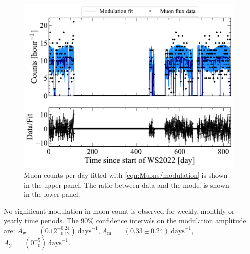 \begin{figure}
    \centering
    \includegraphics[width=0.8\linewidth]{figures/Muons/MuonModulation_MuonFlux_dayFitted.pdf}
    \caption[Muon counts per day fitted with \autoref{eqn:Muons/modulation} is shown in the upper panel. The ratio between data and the model is shown in the lower panel.]{Muon counts per day fitted with \autoref{eqn:Muons/modulation} is shown in the upper panel. The ratio between data and the model is shown in the lower panel.}
    \label{fig:Muons/MuonFlux_dayFitted}
\end{figure}
No significant modulation in muon count is observed for weekly, monthly or yearly time periods. The 90\% confidence intervals on the modulation amplitude are: $A_\text{w}~=~(0.12^{+0.24}_{-0.12})~\text{days}^{-1}$, $A_\text{m}~=~(0.33\pm0.24)~\text{days}^{-1}$, $A_\text{y}~=~(0^{+5}_{-0})~\text{days}^{-1}$.

